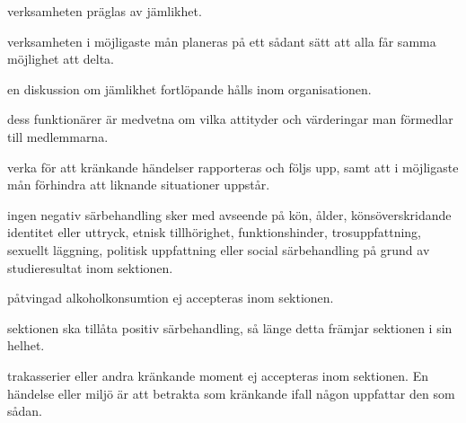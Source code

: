\documentclass{dsekprotokoll}
\begin{document}
\begin{attlista}
\item verksamheten präglas av jämlikhet.
\item verksamheten i möjligaste mån planeras på ett sådant sätt att
  alla får samma möjlighet att delta.
\item en diskussion om jämlikhet fortlöpande hålls inom organisationen.
\item dess funktionärer är medvetna om vilka attityder och
  värderingar man förmedlar till
  medlemmarna.
\item verka för att kränkande händelser rapporteras och följs upp,
  samt att i möjligaste mån
  förhindra att liknande situationer uppstår.
\item ingen negativ särbehandling sker med avseende på kön, ålder,
  könsöverskridande identitet eller uttryck, etnisk tillhörighet,
  funktionshinder, trosuppfattning, sexuellt läggning,
  politisk uppfattning eller social särbehandling på grund av
  studieresultat inom sektionen.
\item påtvingad alkoholkonsumtion ej accepteras inom sektionen.
\item sektionen ska tillåta positiv särbehandling, så länge detta
  främjar sektionen i sin helhet.
\item trakasserier eller andra kränkande moment ej accepteras inom
  sektionen. En händelse
  eller miljö är att betrakta som kränkande ifall någon uppfattar den som sådan.
\end{attlista}
\end{document}
